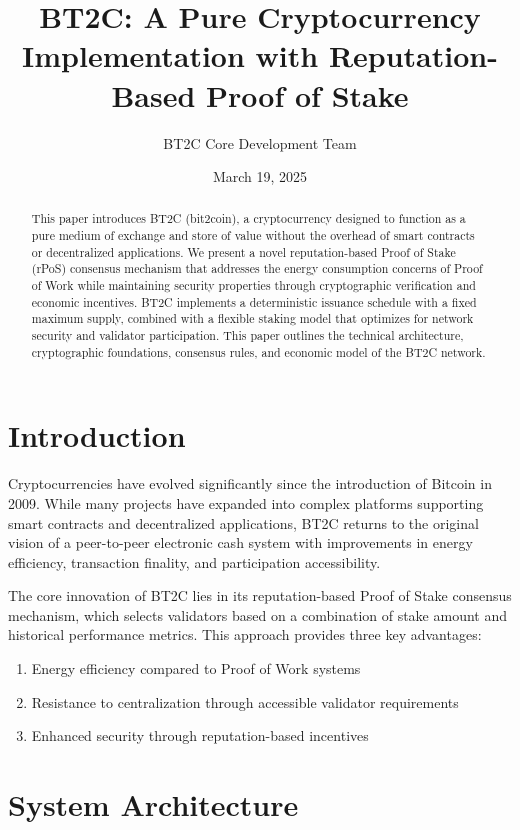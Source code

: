\documentclass[10pt,a4paper]{article}
\title{BT2C: A Pure Cryptocurrency Implementation with Reputation-Based Proof of Stake}
\author{BT2C Core Development Team}
\date{March 19, 2025}
\begin{document}
\maketitle

\begin{abstract}
This paper introduces BT2C (bit2coin), a cryptocurrency designed to function as a pure medium of exchange and store of value without the overhead of smart contracts or decentralized applications. We present a novel reputation-based Proof of Stake (rPoS) consensus mechanism that addresses the energy consumption concerns of Proof of Work while maintaining security properties through cryptographic verification and economic incentives. BT2C implements a deterministic issuance schedule with a fixed maximum supply, combined with a flexible staking model that optimizes for network security and validator participation. This paper outlines the technical architecture, cryptographic foundations, consensus rules, and economic model of the BT2C network.
\end{abstract}

\section{Introduction}
Cryptocurrencies have evolved significantly since the introduction of Bitcoin \cite{nakamoto2008bitcoin} in 2009. While many projects have expanded into complex platforms supporting smart contracts and decentralized applications, BT2C returns to the original vision of a peer-to-peer electronic cash system with improvements in energy efficiency, transaction finality, and participation accessibility.

The core innovation of BT2C lies in its reputation-based Proof of Stake consensus mechanism, which selects validators based on a combination of stake amount and historical performance metrics. This approach provides three key advantages:

\begin{enumerate}
\item Energy efficiency compared to Proof of Work systems
\item Resistance to centralization through accessible validator requirements
\item Enhanced security through reputation-based incentives
\end{enumerate}

\section{System Architecture}
\end{document}
